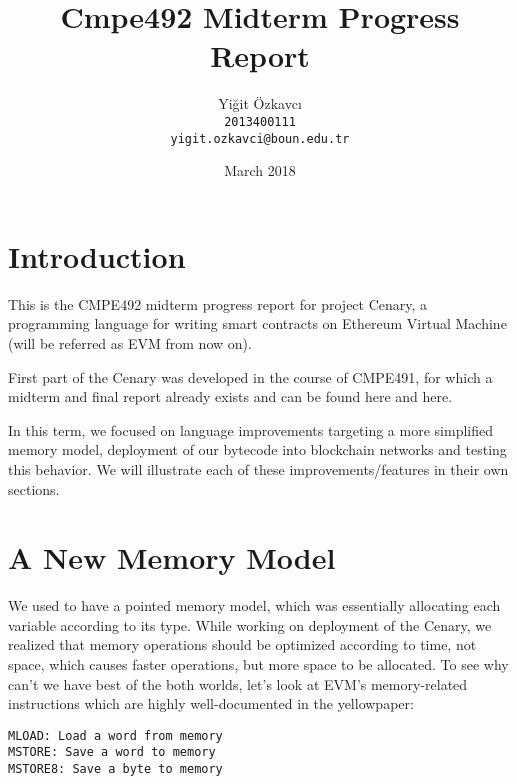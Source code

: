 \documentclass{article}
\title{Cmpe492 Midterm Progress Report}
\author{
  Yiğit Özkavcı \\
  \texttt{2013400111} \\
  \texttt{yigit.ozkavci@boun.edu.tr}
}
\date{March 2018}
\begin{document}

\maketitle

\tableofcontents

\newpage

\section{Introduction}
\par 
\par This is the CMPE492 midterm progress report for project Cenary, a programming language for writing smart contracts on Ethereum Virtual Machine (will be referred as EVM from now on).
\par First part of the Cenary was developed in the course of CMPE491, for which a midterm and final report already exists and can be found here\cite{CMPE491mtreport} and here\cite{CMPE491finalreport}.

In this term, we focused on language improvements targeting a more simplified memory model, deployment of our bytecode into blockchain networks and testing this behavior. We will illustrate each of these improvements/features in their own sections.

\section{A New Memory Model}
We used to have a pointed memory model, which was essentially allocating each variable according to its type. While working on deployment of the Cenary, we realized that memory operations should be optimized according to time, not space, which causes faster operations, but more space to be allocated. To see why can't we have best of the both worlds, let's look at EVM's memory-related instructions which are highly well-documented in the yellowpaper\cite{yellowpaper}:
\begin{lstlisting}
MLOAD: Load a word from memory
MSTORE: Save a word to memory
MSTORE8: Save a byte to memory
\end{lstlisting}
\end{document}
